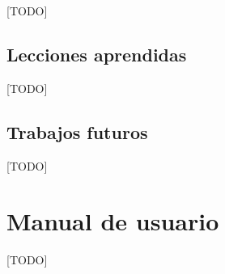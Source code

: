 \documentclass[a4paper, 12pt]{book}
\begin{document}
[TODO]

\section{Lecciones aprendidas}
\label{sec:lecciones_aprendidas}

[TODO]

\section{Trabajos futuros}
\label{sec:trabajos_futuros}

[TODO]



\cleardoublepage
\appendix
\chapter{Manual de usuario}
\label{app:manual}

[TODO]


\cleardoublepage


\end{document}
